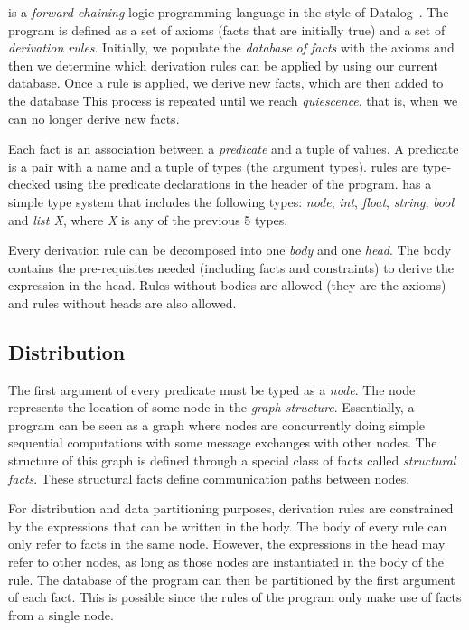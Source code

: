 \lang is a \emph{forward chaining} logic programming language in the style of Datalog~\cite{Ullman:1990:PDK:533142}. The program is defined as a set of axioms (facts that are initially true) and a set of \emph{derivation rules}. Initially, we populate the \emph{database of facts} with the axioms and then we determine which derivation rules can be applied by using our current database. Once a rule is applied, we derive new facts, which are then added to the database
This process is repeated until we reach \emph{quiescence}, that is, when we can no longer derive new facts.

Each fact is an association between a \emph{predicate} and a tuple of values. A predicate is a pair with a name and a tuple of types (the argument types). \lang rules are type-checked using the predicate declarations in the header of the program. \lang has a simple type system that includes the following types: \emph{node}, \emph{int}, \emph{float}, \emph{string}, \emph{bool} and \emph{list X}, where \emph{X} is any of the previous 5 types.

Every derivation rule can be decomposed into one \emph{body} and one \emph{head}. The body contains the pre-requisites needed (including facts and constraints) to derive the expression in the head. Rules without bodies are allowed (they are the axioms) and rules without heads are also allowed.

\subsection{Distribution}

The first argument of every predicate must be typed as a \emph{node}. The node represents the location of some node in the \emph{graph structure}. Essentially, a program can be seen as a graph where nodes are concurrently doing simple sequential computations with some message exchanges with other nodes. The structure of this graph is defined through a special class of facts called \emph{structural facts}. These structural facts define communication paths between nodes.

For distribution and data partitioning purposes, derivation rules are constrained by the expressions that can be written in the body. The body of every rule can only refer to facts in the same node.
However, the expressions in the head may refer to other nodes, as long as those nodes are instantiated in the body of the rule. The database of the program can then be partitioned by the first argument of each fact. This is possible since the rules of the program only make use of facts from a single node.

